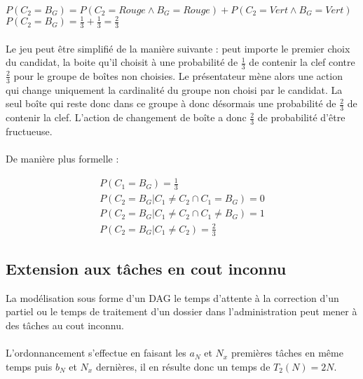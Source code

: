 \documentclass[11pt]{article}
\begin{document}
\paragraph{}
$P(C_2=B_G) = P(C_2=Rouge \wedge B_G=Rouge) + P(C_2=Vert \wedge B_G=Vert)$ \\
$P(C_2=B_G) = \frac{1}{3} + \frac{1}{3} = \frac{2}{3}$

\paragraph{}
Le jeu peut être simplifié de la manière suivante : peut importe le premier choix du candidat, la boite qu'il choisit à une probabilité de $\frac{1}{3}$ de contenir la clef contre $\frac{2}{3}$ pour le groupe de boîtes non choisies. Le présentateur mène alors une action qui change uniquement la cardinalité du groupe non choisi par le candidat. La seul boîte qui reste donc dans ce groupe à donc désormais une probabilité de $\frac{2}{3}$ de contenir la clef. L'action de changement de boîte a donc $\frac{2}{3}$ de probabilité d'être fructueuse.

\paragraph{}
De manière plus formelle :

\begin{gather}
  P(C_1=B_G) = \frac{1}{3} \\
  P(C_2=B_G|C_1 \neq C_2 \cap C_1 = B_G) = 0 \\
  P(C_2=B_G|C_1 \neq C_2 \cap C_1 \neq B_G) = 1 \\
  P(C_2=B_G|C_1 \neq C_2) = \frac{2}{3}
\end{gather}


\subsection{Extension aux tâches en cout inconnu}
La modélisation sous forme d'un DAG le temps d'attente à la correction d'un partiel ou le temps de traitement d'un dossier dans l'administration peut mener à des tâches au cout inconnu. 

\paragraph{}
L'ordonnancement s'effectue en faisant les $a_N$ et $N_x$ premières tâches en même temps puis $b_N$ et $N_x$ dernières, il en résulte donc un temps de $T_2(N) = 2N$.
\end{document}

